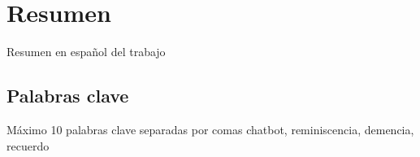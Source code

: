 \chapter*{Resumen}

Resumen en español del trabajo


\section*{Palabras clave}
   
\noindent Máximo 10 palabras clave separadas por comas
chatbot, reminiscencia, demencia, recuerdo

   


